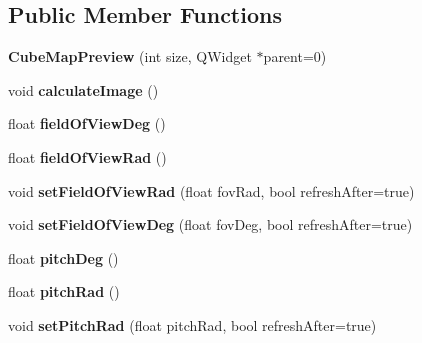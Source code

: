 \subsection*{\-Public \-Member \-Functions}
\begin{DoxyCompactItemize}
\item 
\hypertarget{class_cube_map_preview_abb1f170447f0083dab58ea211ad381f4}{
{\bfseries \-Cube\-Map\-Preview} (int size, \-Q\-Widget $\ast$parent=0)}
\label{class_cube_map_preview_abb1f170447f0083dab58ea211ad381f4}

\item 
\hypertarget{class_cube_map_preview_a11b3e78733774c8bc131f53e3aca8172}{
void {\bfseries calculate\-Image} ()}
\label{class_cube_map_preview_a11b3e78733774c8bc131f53e3aca8172}

\item 
\hypertarget{class_cube_map_preview_aed034109dd4757c6cb11ad0f2965846b}{
float {\bfseries field\-Of\-View\-Deg} ()}
\label{class_cube_map_preview_aed034109dd4757c6cb11ad0f2965846b}

\item 
\hypertarget{class_cube_map_preview_a27e5557d55e959b489c479544ef8b2a8}{
float {\bfseries field\-Of\-View\-Rad} ()}
\label{class_cube_map_preview_a27e5557d55e959b489c479544ef8b2a8}

\item 
\hypertarget{class_cube_map_preview_a9a157bd127ac7c90900bdb5a70131009}{
void {\bfseries set\-Field\-Of\-View\-Rad} (float fov\-Rad, bool refresh\-After=true)}
\label{class_cube_map_preview_a9a157bd127ac7c90900bdb5a70131009}

\item 
\hypertarget{class_cube_map_preview_a0db89977044cf72356a3de5e9a0a62bb}{
void {\bfseries set\-Field\-Of\-View\-Deg} (float fov\-Deg, bool refresh\-After=true)}
\label{class_cube_map_preview_a0db89977044cf72356a3de5e9a0a62bb}

\item 
\hypertarget{class_cube_map_preview_a8545273f5ebf25b66aaf37844aeee07e}{
float {\bfseries pitch\-Deg} ()}
\label{class_cube_map_preview_a8545273f5ebf25b66aaf37844aeee07e}

\item 
\hypertarget{class_cube_map_preview_ac52bd80c37fa34c59df8f2c3f8c43928}{
float {\bfseries pitch\-Rad} ()}
\label{class_cube_map_preview_ac52bd80c37fa34c59df8f2c3f8c43928}

\item 
\hypertarget{class_cube_map_preview_abfdf1dd5d7e10101db602226da397203}{
void {\bfseries set\-Pitch\-Rad} (float pitch\-Rad, bool refresh\-After=true)}
\label{class_cube_map_preview_abfdf1dd5d7e10101db602226da397203}


\end{DoxyCompactItemize}
